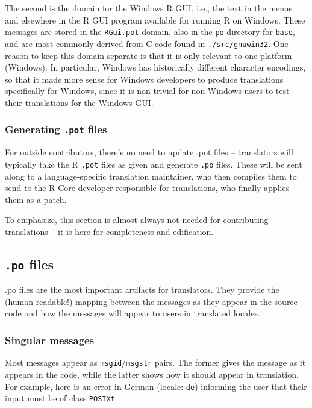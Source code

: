 \documentclass[
]{book}
\begin{document}
The second is the domain for the Windows R GUI, i.e., the text in the menus and elsewhere in the R GUI program
available for running R on Windows. These messages are stored in the \texttt{RGui.pot} domain, also in the \texttt{po}
directory for \texttt{base}, and are most commonly derived from C code found in \texttt{./src/gnuwin32}. One reason to keep
this domain separate is that it is only relevant to one platform (Windows). In particular, Windows has historically
different character encodings, so that it made more sense for Windows developers to produce translations specifically for Windows, since it is non-trivial for non-Windows users to test their translations for the Windows GUI.

\hypertarget{generating-.pot-files}{%
\subsubsection{\texorpdfstring{Generating \texttt{.pot} files}{Generating .pot files}}\label{generating-.pot-files}}

For outside contributors, there's no need to update .pot files -- translators will typically take the R \texttt{.pot} files
as given and generate \texttt{.po} files. These will be sent along to a language-specific translation maintainer, who then
compiles them to send to the R Core developer responsible for translations, who finally applies them as a patch.

To emphasize, this section is almost always not needed for contributing translations -- it is here for
completeness and edification.

\hypertarget{po-files}{%
\subsection{\texorpdfstring{\texttt{.po} files}{.po files}}\label{po-files}}

.po files are the most important artifacts for translators. They provide the (human-readable!) mapping between
the messages as they appear in the source code and how the messages will appear to users in translated locales.

\hypertarget{singular-messages}{%
\subsubsection{Singular messages}\label{singular-messages}}

Most messages appear as \texttt{msgid}/\texttt{msgstr} pairs. The former gives the message as it appears in the code, while the
latter shows how it should appear in translation. For example, here is an error in German (locale: \texttt{de}) informing
the user that their input must be of class \texttt{POSIXt}
\end{document}
